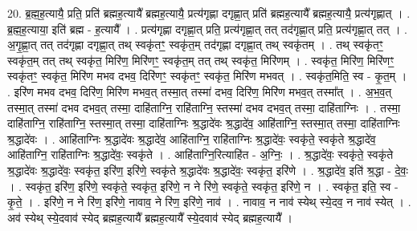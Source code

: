 \documentclass[17pt]{extarticle}
\begin{document}
20. ब्र॒ह्म॒ह॒त्यायै॒ प्रति॒ प्रति॑ ब्रह्मह॒त्यायै᳚ ब्रह्मह॒त्यायै॒ प्रत्य॑गृह्णा दगृह्णा॒त् प्रति॑ ब्रह्मह॒त्यायै᳚ ब्रह्मह॒त्यायै॒ प्रत्य॑गृह्णात् । . ब्र॒ह्म॒ह॒त्याया॒ इति॑ ब्रह्म - ह॒त्यायै᳚ । . प्रत्य॑गृह्णा दगृह्णा॒त् प्रति॒ प्रत्य॑गृह्णा॒त् तत् तद॑गृह्णा॒त् प्रति॒ प्रत्य॑गृह्णा॒त् तत् । . अ॒गृ॒ह्णा॒त् तत् तद॑गृह्णा दगृह्णा॒त् तथ् स्वकृ॑तꣳ॒॒ स्वकृ॑त॒म् तद॑गृह्णा दगृह्णा॒त् तथ् स्वकृ॑तम् । . तथ् स्वकृ॑तꣳ॒॒ स्वकृ॑त॒म् तत् तथ् स्वकृ॑त॒ मिरि॑ण॒ मिरि॑णꣳ॒॒ स्वकृ॑त॒म् तत् तथ् स्वकृ॑त॒ मिरि॑णम् । . स्वकृ॑त॒ मिरि॑ण॒ मिरि॑णꣳ॒॒ स्वकृ॑तꣳ॒॒ स्वकृ॑त॒ मिरि॑ण मभव दभव॒ दिरि॑णꣳ॒॒ स्वकृ॑तꣳ॒॒ स्वकृ॑त॒ मिरि॑ण मभवत् । . स्वकृ॑त॒मिति॒ स्व - कृ॒त॒म् । . इरि॑ण मभव दभव॒ दिरि॑ण॒ मिरि॑ण मभव॒त् तस्मा॒त् तस्मा॑ दभव॒ दिरि॑ण॒ मिरि॑ण मभव॒त् तस्मा᳚त् । . अ॒भ॒व॒त् तस्मा॒त् तस्मा॑ दभव दभव॒त् तस्मा॒ दाहि॑ताग्नि॒ राहि॑ताग्नि॒ स्तस्मा॑ दभव दभव॒त् तस्मा॒ दाहि॑ताग्निः । . तस्मा॒ दाहि॑ताग्नि॒ राहि॑ताग्नि॒ स्तस्मा॒त् तस्मा॒ दाहि॑ताग्निः श्र॒द्धादे॑वः श्र॒द्धादे॑व॒ आहि॑ताग्नि॒ स्तस्मा॒त् तस्मा॒ दाहि॑ताग्निः श्र॒द्धादे॑वः । . आहि॑ताग्निः श्र॒द्धादे॑वः श्र॒द्धादे॑व॒ आहि॑ताग्नि॒ राहि॑ताग्निः श्र॒द्धादे॑वः॒ स्वकृ॑ते॒ स्वकृ॑ते श्र॒द्धादे॑व॒ आहि॑ताग्नि॒ राहि॑ताग्निः श्र॒द्धादे॑वः॒ स्वकृ॑ते । . आहि॑ताग्नि॒रित्याहि॑त - अ॒ग्निः॒ । . श्र॒द्धादे॑वः॒ स्वकृ॑ते॒ स्वकृ॑ते श्र॒द्धादे॑वः श्र॒द्धादे॑वः॒ स्वकृ॑त॒ इरि॑ण॒ इरि॑णे॒ स्वकृ॑ते श्र॒द्धादे॑वः श्र॒द्धादे॑वः॒ स्वकृ॑त॒ इरि॑णे । . श्र॒द्धादे॑व॒ इति॑ श्र॒द्धा - दे॒वः॒ । . स्वकृ॑त॒ इरि॑ण॒ इरि॑णे॒ स्वकृ॑ते॒ स्वकृ॑त॒ इरि॑णे॒ न ने रि॑णे॒ स्वकृ॑ते॒ स्वकृ॑त॒ इरि॑णे॒ न । . स्वकृ॑त॒ इति॒ स्व - कृ॒ते॒ । . इरि॑णे॒ न ने रि॑ण॒ इरि॑णे॒ नावाव॒ ने रि॑ण॒ इरि॑णे॒ नाव॑ । . नावाव॒ न नाव॑ स्येथ् स्ये॒दव॒ न नाव॑ स्येत् । . अव॑ स्येथ् स्ये॒दवाव॑ स्येद् ब्रह्मह॒त्यायै᳚ ब्रह्मह॒त्यायै᳚ स्ये॒दवाव॑ स्येद् ब्रह्मह॒त्यायै᳚ । \newline
\end{document}
